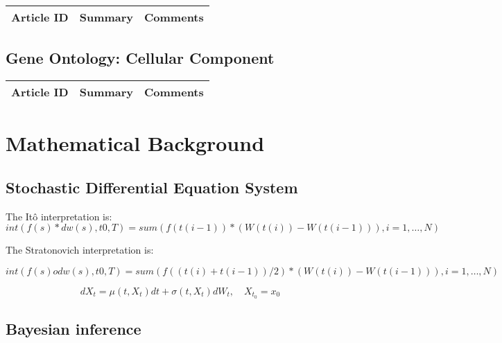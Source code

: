 \begin{table}[H]\centering
	\begin{tabular}{p{1cm}p{4cm}p{3cm}}
		Article ID & Summary & Comments\\
		\hline
		\hline
	\end{tabular}
\end{table}

\subsection{Gene Ontology: Cellular Component}

\begin{table}[H]\centering
	\begin{tabular}{p{1cm}p{4cm}p{3cm}}
		Article ID & Summary & Comments\\
		\hline
		\hline
	\end{tabular}
\end{table}

\section{Mathematical Background}

\subsection{Stochastic Differential Equation System}

The Itô interpretation is:
\begin{equation}
int(f(s)*dw(s),t0,T) = sum(f(t(i-1)) * (W(t(i)) - W(t(i-1))),i=1,…,N)
\end{equation}

The Stratonovich interpretation is:

\begin{equation}
int(f(s) o dw(s),t0,T) = sum(f((t(i)+t(i-1))/2) * (W(t(i)) - W(t(i-1))),i=1,…,N)
\end{equation}

\begin{equation}\label{eds01}
dX_t = \mu(t,X_t) dt + \sigma(t,X_t) dW_t,\quad X_{t_{0}}=x_{0}
\end{equation}


\begin{enumerate}
\end{enumerate}

\subsection{Bayesian inference}

